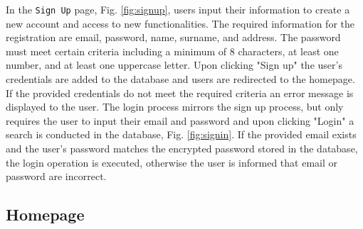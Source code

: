 In the \texttt{Sign Up} page, Fig. \ref{fig:signup}, users input their information to create a new account and access to new functionalities. The required information for the registration are email, password, name, surname, and address. The password must meet certain criteria including a minimum of 8 characters, at least one number, and at least one uppercase letter. Upon clicking "Sign up" the user's credentials are added to the database and users are redirected to the homepage. If the provided credentials do not meet the required criteria an error message is displayed to the user. The login process mirrors the sign up process, but only requires the user to input their email and password and upon clicking "Login" a search is conducted in the database, Fig. \ref{fig:signin}. If the provided email exists and the user's password matches the encrypted password stored in the database, the login operation is executed, otherwise the user is informed that email or password are incorrect.

\subsection{Homepage}

